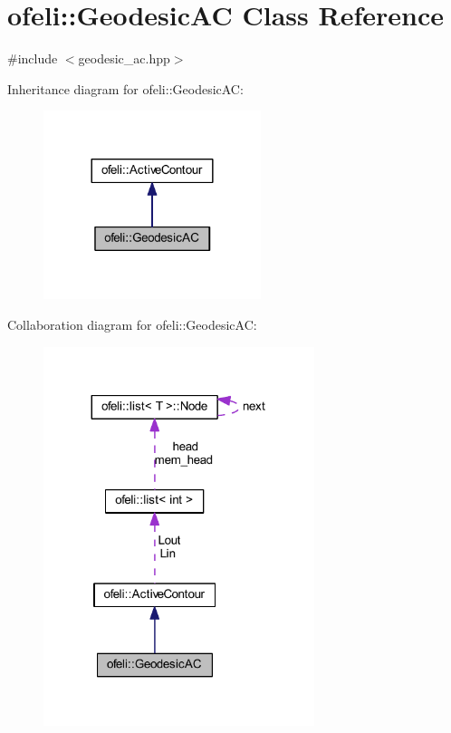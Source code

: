 \hypertarget{classofeli_1_1_geodesic_a_c}{\section{ofeli\-:\-:Geodesic\-A\-C Class Reference}
\label{classofeli_1_1_geodesic_a_c}
}


{\ttfamily \#include $<$geodesic\-\_\-ac.\-hpp$>$}



Inheritance diagram for ofeli\-:\-:Geodesic\-A\-C\-:\nopagebreak
\begin{figure}[H]
\begin{center}
\leavevmode
\includegraphics[width=180pt]{classofeli_1_1_geodesic_a_c__inherit__graph}
\end{center}
\end{figure}


Collaboration diagram for ofeli\-:\-:Geodesic\-A\-C\-:\nopagebreak
\begin{figure}[H]
\begin{center}
\leavevmode
\includegraphics[width=224pt]{classofeli_1_1_geodesic_a_c__coll__graph}
\end{center}
\end{figure}

